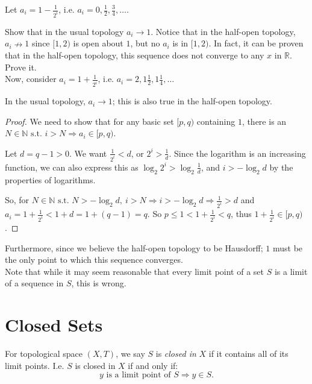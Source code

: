 \documentclass[12pt]{report}
\newcommand{\example}{  \noindent{\sc Example }\hspace{5pt} }
\newcommand{\exercise}{ \noindent{\sc Exercise }\hspace{5pt} }
\newcommand{\define}{  \noindent{\sc Definition }\hspace{5pt} }
\newcommand{\st}{\textrm{ s.t. }}
\newcommand{\reals}{\mathbb{R}}
\newcommand{\naturals}{\mathbb{N}}
\begin{document}
\example Let $a_i = 1 - \frac{1}{2^i}$, i.e. $a_i = 0, \frac{1}{2},
\frac{3}{4}, \dots$.

\exercise Show that in the usual topology $a_i \rightarrow 1$. Notice that in
the half-open topology, $a_i \nrightarrow 1$ since $[1,2)$ is open about $1$,
but no $a_i$ is in $[1,2)$. In fact, it can be proven that in the half-open
topology, this sequence does not converge to any $x$ in $\reals$. Prove it.\\

Now, consider $a_i = 1 + \frac{1}{2^i}$, i.e. $a_i = 2, 1\frac{1}{2}, 
1\frac{1}{4}, \dots$

In the usual topology, $a_i \rightarrow 1$; this is also
true in the half-open topology.

\begin{proof}
We need to show that for any basic set $[p, q)$ containing $1$, there
is an $N \in \naturals \st i > N \Rightarrow a_i \in [p,q)$. 

Let $d = q - 1 > 0$. We want $\frac{1}{2^i} < d$, or $2^i > \frac{1}{d}$.
Since the logarithm is an increasing function, we can also express this as 
$\log_2 2^i > \log_2 \frac{1}{d}$, and $i > -\log_2 d$ by the properties of
logarithms.

So, for $N \in \naturals \st N > -\log_2 d,\ i > N \Rightarrow i > -\log_2 d
\Rightarrow \frac{1}{2^i} > d$ and $a_i = 1 + \frac{1}{2^i} < 1 + d = 1 + (q -
1) = q$. So $p \leq 1 < 1 + \frac{1}{2^i} < q$, thus $1 + \frac{1}{2^i} \in
[p,q)$.
\end{proof}

Furthermore, since we believe the half-open topology to be Hausdorff; $1$ must
be the only point to which this sequence converges.\\

Note that while it may seem reasonable that every limit point of a set $S$ is
a limit of a sequence in $S$, this is wrong. \\

\section{Closed Sets}

\define For topological space $(X, T)$, we say $S$ is {\em closed in } $X$ if
it contains all of its limit points.  I.e. $S$ is closed in $X$ if and only
if:
\begin{displaymath}
y \textrm{ is a limit point of } S \Rightarrow y \in S.
\end{displaymath}
\end{document}
